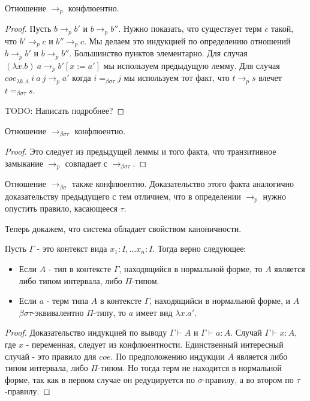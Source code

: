 \documentclass{amsart}
\theoremstyle{definition}
\theoremstyle{remark}
\newcommand{\bs}{\beta\sigma}
\newcommand{\rbs}{\to_{\bs}}
\newcommand{\bst}{\bs\tau}
\newcommand{\ebst}{=_{\bst}}
\newcommand{\rbst}{\to_{\bst}}
\numberwithin{figure}{section}
\begin{document}
\begin{lem}
Отношение $\to_p$ конфлюентно.
\end{lem}
\begin{proof}
Пусть $b \to_p b'$ и $b \to_p b''$.
Нужно показать, что существует терм $c$ такой, что $b' \to_p c$ и $b'' \to_p c$.
Мы делаем это индукцией по определению отношений $b \to_p b'$ и $b \to_p b''$.
Большинство пунктов элементарно.
Для случая $(\lambda x. b)\ a \to_p b'[x := a']$ мы используем предыдущую лемму.
Для случая $coe_{\lambda k. A}\ i\ a\ j \to_p a'$ когда $i \ebst j$ мы используем тот факт, что $t \to_p s$ влечет $t \ebst s$.

TODO: Написать подробнее?
\end{proof}

\begin{prop}
Отношение $\rbst$ конфлюентно.
\end{prop}
\begin{proof}
Это следует из предыдущей леммы и того факта, что транзитивное замыкание $\to_p$ совпадает с $\rbst$.
\end{proof}

\begin{remark}
Отношение $\rbs$ также конфлюентно.
Доказательство этого факта аналогично доказательству предыдущего с тем отличием, что в определении $\to_p$ нужно опустить правило, касающееся $\tau$.
\end{remark}

Теперь докажем, что система обладает свойством каноничности.

\begin{prop}
Пусть $\Gamma$ - это контекст вида $x_1 : I, \ldots x_n : I$.
Тогда верно следующее:
\begin{itemize}
\item Если $A$ - тип в контексте $\Gamma$, находящийся в нормальной форме, то $A$ является либо типом интервала, либо $\Pi$-типом.
\item Если $a$ - терм типа $A$ в контексте $\Gamma$, находящийси в нормальной форме, и $A$ $\bst$-эквивалентно $\Pi$-типу, то $a$ имеет вид $\lambda x. a'$.
\end{itemize}
\end{prop}
\begin{proof}
Доказательство индукцией по выводу $\Gamma \vdash A$ и $\Gamma \vdash a : A$.
Случай $\Gamma \vdash x : A$, где $x$ - переменная, следует из конфлюентности.
Единственный интересный случай - это правило для $coe$.
По предположению индукции $A$ является либо типом интервала, либо $\Pi$-типом.
Но тогда терм не находится в нормальной форме, так как в первом случае он редуцируется по $\sigma$-правилу, а во втором по $\tau$-правилу.
\end{proof}
\end{document}
